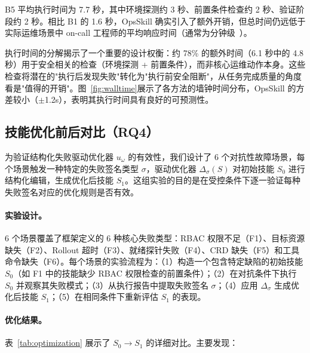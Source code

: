 \documentclass[11pt,a4paper]{ctexart}
\begin{document}
B5 平均执行时间为 7.7 秒，其中环境探测约 3 秒、前置条件检查约 2 秒、验证阶段约 2 秒。相比 B1 的 1.6 秒，OpsSkill 确实引入了额外开销，但总时间仍远低于实际运维场景中 on-call 工程师的平均响应时间（通常为分钟级~\cite{ghosh2022incidents}）。

执行时间的分解揭示了一个重要的设计权衡：约 78\% 的额外时间（6.1 秒中的 4.8 秒）用于安全相关的检查（环境探测 + 前置条件），而非核心运维动作本身。这些检查将潜在的"执行后发现失败"转化为"执行前安全阻断"，从任务完成质量的角度看是"值得的开销"。图~\ref{fig:walltime}展示了各方法的墙钟时间分布，OpsSkill 的方差较小（$\pm$1.2s），表明其执行时间具有良好的可预测性。


\subsection{技能优化前后对比（RQ4）}

为验证结构化失败驱动优化器 $u_\omega$ 的有效性，我们设计了 6 个对抗性故障场景，每个场景触发一种特定的失败签名类型 $\sigma$，驱动优化器 $\Delta_\sigma(S)$ 对初始技能 $S_0$ 进行结构化编辑，生成优化后技能 $S_1$。这组实验的目的是在受控条件下逐一验证每种失败签名对应的优化规则是否有效。

\paragraph{实验设计。}
6 个场景覆盖了框架定义的 6 种核心失败类型：RBAC 权限不足（F1）、目标资源缺失（F2）、Rollout 超时（F3）、就绪探针失败（F4）、CRD 缺失（F5）和工具命令缺失（F6）。每个场景的实验流程为：（1）构造一个包含特定缺陷的初始技能 $S_0$（如 F1 中的技能缺少 RBAC 权限检查的前置条件）；（2）在对抗条件下执行 $S_0$ 并观察其失败模式；（3）从执行报告中提取失败签名 $\sigma$；（4）应用 $\Delta_\sigma$ 生成优化后技能 $S_1$；（5）在相同条件下重新评估 $S_1$ 的表现。



\paragraph{优化结果。}



表~\ref{tab:optimization} 展示了 $S_0 \to S_1$ 的详细对比。主要发现：
\end{document}
